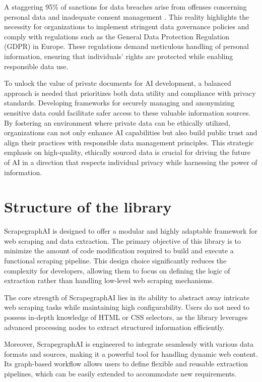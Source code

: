 A staggering 95\% of sanctions for data breaches arise from offenses concerning personal data and inadequate consent management \cite{13}. This reality highlights the necessity for organizations to implement stringent data governance policies and comply with regulations such as the General Data Protection Regulation (GDPR) in Europe. These regulations demand meticulous handling of personal information, ensuring that individuals' rights are protected while enabling responsible data use.

To unlock the value of private documents for AI development, a balanced approach is needed that prioritizes both data utility and compliance with privacy standards. Developing frameworks for securely managing and anonymizing sensitive data could facilitate safer access to these valuable information sources. By fostering an environment where private data can be ethically utilized, organizations can not only enhance AI capabilities but also build public trust and align their practices with responsible data management principles. This strategic emphasis on high-quality, ethically sourced data is crucial for driving the future of AI in a direction that respects individual privacy while harnessing the power of information.
\newpage

\section{Structure of the library}
ScrapegraphAI is designed to offer a modular and highly adaptable framework for web scraping and data extraction. The primary objective of this library is to minimize the amount of code modification required to build and execute a functional scraping pipeline. This design choice significantly reduces the complexity for developers, allowing them to focus on defining the logic of extraction rather than handling low-level web scraping mechanisms.

The core strength of ScrapegraphAI lies in its ability to abstract away intricate web scraping tasks while maintaining high configurability. Users do not need to possess in-depth knowledge of HTML or CSS selectors, as the library leverages advanced processing nodes to extract structured information efficiently. 

Moreover, ScrapegraphAI is engineered to integrate seamlessly with various data formats and sources, making it a powerful tool for handling dynamic web content. Its graph-based workflow allows users to define flexible and reusable extraction pipelines, which can be easily extended to accommodate new requirements. 

